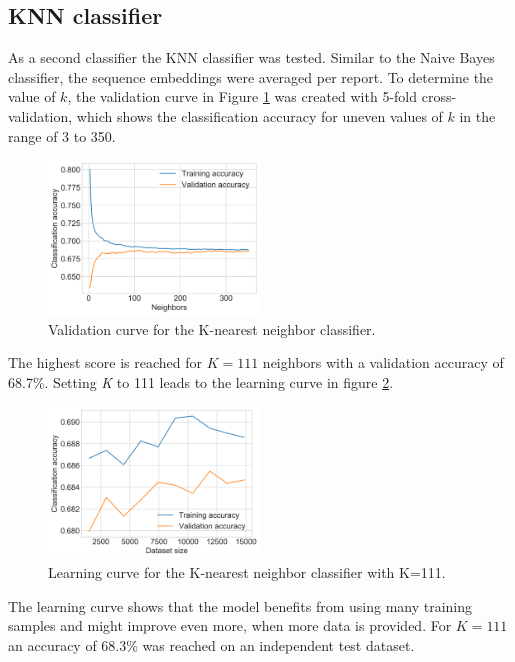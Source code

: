 \subsection{\acl{KNN} classifier}
As a second classifier the \acl{KNN} classifier was tested.
Similar to the Naive Bayes classifier, the sequence embeddings were averaged per report.
To determine the value of $k$, the validation curve in Figure \ref{figure:knn_validation} was created with 5-fold cross-validation, which shows the classification accuracy for uneven values of $k$ in the range of 3 to 350.
\begin{figure}[h]
    \centering
    \includegraphics[width=0.5\textwidth]{figures/charts/knn_validation.png}
    \caption{Validation curve for the K-nearest neighbor classifier.}
    \label{figure:knn_validation}
\end{figure}
The highest score is reached for $K=111$ neighbors with a validation accuracy of 68.7\%.
Setting \textit{K} to 111 leads to the learning curve in figure \ref{figure:knn_learning}.
\begin{figure}[h]
    \centering
    \includegraphics[width=0.5\textwidth]{figures/charts/knn_learning.png}
    \caption{Learning curve for the K-nearest neighbor classifier with K=111.}
    \label{figure:knn_learning}
\end{figure}
The learning curve shows that the model benefits from using many training samples and might improve even more, when more data is provided.
For $K=111$ an accuracy of 68.3\% was reached on an independent test dataset.

